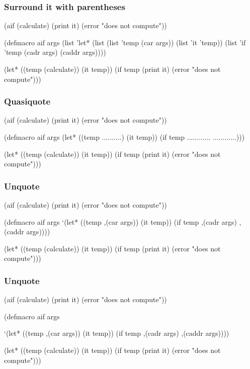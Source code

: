 \documentclass[hyperref={bookmarks=false}]{beamer}
\begin{document}
\begin{frame}[fragile]
\frametitle{Surround it with parentheses}
\begin{semiverbatim}
(aif (calculate)
  (print it)
  (error "does not compute"))

(defmacro aif args
  \alert{(list '}let* \alert{(list (list '}temp  (car args))
  \alert{                  (list '}it \alert{'}temp\alert{))}
    \alert{(list '}if \alert{'}temp
             (cadr args)
             (caddr args)\alert{))})

(let* ((temp (calculate))
       (it temp))
  (if temp
    (print it)
    (error "does not compute")))
\end{semiverbatim}
\end{frame}

\begin{frame}[fragile]
\frametitle{Quasiquote}
\begin{semiverbatim}
(aif (calculate)
  (print it)
  (error "does not compute"))

(defmacro aif args
  (let*            ((temp  ..........)
                          (it  temp))
          (if  temp
             ............
             ............)))

(let* ((temp (calculate))
       (it temp))
  (if temp
    (print it)
    (error "does not compute")))
\end{semiverbatim}
\end{frame}

\begin{frame}[fragile]
\frametitle{Unquote}
\begin{semiverbatim}
(aif (calculate)
  (print it)
  (error "does not compute"))

(defmacro aif args
  \alert{     `}(let*            ((temp \alert{,(car args)})
                          (it  temp))
          (if  temp
            \alert{,(cadr args)}
            \alert{,(caddr args)})))

(let* ((temp (calculate))
       (it temp))
  (if temp
    (print it)
    (error "does not compute")))
\end{semiverbatim}
\end{frame}

\begin{frame}[fragile]
\frametitle{Unquote}
\begin{semiverbatim}
(aif (calculate)
  (print it)
  (error "does not compute"))

(defmacro  aif args

 `(let* ((temp ,(car args))
         (it temp))
    (if temp
        ,(cadr args)
        ,(caddr args))))

(let* ((temp (calculate))
       (it temp))
  (if temp
    (print it)
    (error "does not compute")))
\end{semiverbatim}
\end{frame}
\end{document}

